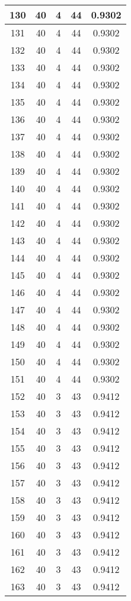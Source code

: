 \documentclass[letterpaper, 12pt]{article}
\begin{document}
\begin{longtable}{|c|c|c|c|c|}
\hline
130 & 40 & 4 & 44 & 0.9302 \\
\hline
131 & 40 & 4 & 44 & 0.9302 \\
\hline
132 & 40 & 4 & 44 & 0.9302 \\
\hline
133 & 40 & 4 & 44 & 0.9302 \\
\hline
134 & 40 & 4 & 44 & 0.9302 \\
\hline
135 & 40 & 4 & 44 & 0.9302 \\
\hline
136 & 40 & 4 & 44 & 0.9302 \\
\hline
137 & 40 & 4 & 44 & 0.9302 \\
\hline
138 & 40 & 4 & 44 & 0.9302 \\
\hline
139 & 40 & 4 & 44 & 0.9302 \\
\hline
140 & 40 & 4 & 44 & 0.9302 \\
\hline
141 & 40 & 4 & 44 & 0.9302 \\
\hline
142 & 40 & 4 & 44 & 0.9302 \\
\hline
143 & 40 & 4 & 44 & 0.9302 \\
\hline
144 & 40 & 4 & 44 & 0.9302 \\
\hline
145 & 40 & 4 & 44 & 0.9302 \\
\hline
146 & 40 & 4 & 44 & 0.9302 \\
\hline
147 & 40 & 4 & 44 & 0.9302 \\
\hline
148 & 40 & 4 & 44 & 0.9302 \\
\hline
149 & 40 & 4 & 44 & 0.9302 \\
\hline
150 & 40 & 4 & 44 & 0.9302 \\
\hline
151 & 40 & 4 & 44 & 0.9302 \\
\hline
152 & 40 & 3 & 43 & 0.9412 \\
\hline
153 & 40 & 3 & 43 & 0.9412 \\
\hline
154 & 40 & 3 & 43 & 0.9412 \\
\hline
155 & 40 & 3 & 43 & 0.9412 \\
\hline
156 & 40 & 3 & 43 & 0.9412 \\
\hline
157 & 40 & 3 & 43 & 0.9412 \\
\hline
158 & 40 & 3 & 43 & 0.9412 \\
\hline
159 & 40 & 3 & 43 & 0.9412 \\
\hline
160 & 40 & 3 & 43 & 0.9412 \\
\hline
161 & 40 & 3 & 43 & 0.9412 \\
\hline
162 & 40 & 3 & 43 & 0.9412 \\
\hline
163 & 40 & 3 & 43 & 0.9412 \\

\end{longtable}
\end{document}

